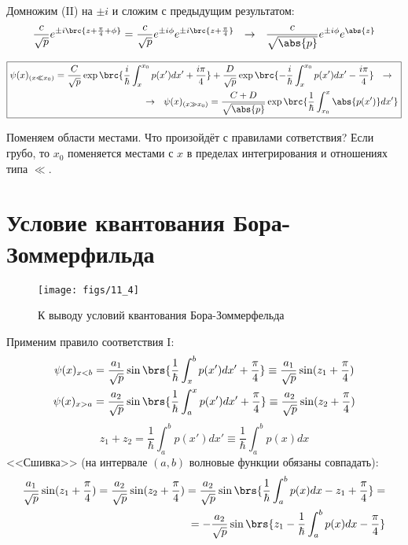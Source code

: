 Домножим (II) на $\pm i$ и сложим с предыдущим результатом:
$$
\frac{c}{\sqrt{p}} e^{\pm i\brc{z+\frac{\pi}{4}+\phi}} = \frac{c}{\sqrt{p}} e^{\pm i \phi} e^{\pm i\brc{z+\frac{\pi}{4}}} ~~\rightarrow~~
\frac{c}{\sqrt{\abs{p}}} e^{\pm i \phi} e^{\abs{z}}
$$

$$
\boxed{
\begin{aligned}
	\psi(x)_{(x \ll x_0)} = \frac{C}{\sqrt{p}} \exp\brc{\frac{i}{\hbar} \int_{x}^{x_0} p(x')dx' + \frac{i\pi}{4}} 
	+ \frac{D}{\sqrt{p}} \exp\brc{-\frac{i}{\hbar} \int_{x}^{x_0} p(x')dx' - \frac{i\pi}{4}} ~~\rightarrow~~ \\
	~~\rightarrow~~ \psi(x)_{(x \gg x_0)} = \frac{C+D}{\sqrt{\abs{p}}} \exp\brc{\frac{1}{\hbar} \int_{x_0}^{x} \abs{p(x')}dx'}
\end{aligned}
}
$$

Поменяем области местами. Что произойдёт с правилами сответствия? Если грубо, то $x_0$ поменяется местами с $x$ в пределах интегрирования и отношениях типа $\ll$.


\section{Условие квантования Бора-Зоммерфильда}

\begin{figure}[h]
\centering
\texttt{[image: figs/11\_4]}
\caption{К выводу условий квантования Бора-Зоммерфельда}
\label{fig:11_4}
\end{figure}

Применим правило соответствия I:
$$
\begin{gathered}
\psi(x)_{x<b} = \frac{a_1}{\sqrt{p}} \sin\brs{\frac{1}{\hbar} \int_{x}^{b} p(x')dx' + \frac{\pi}{4} } \equiv \frac{a_1}{\sqrt{p}} \sin({z_1 + \frac{\pi}{4}}) \\
\psi(x)_{x>a} = \frac{a_2}{\sqrt{p}} \sin\brs{\frac{1}{\hbar} \int_{a}^{x} p(x')dx' + \frac{\pi}{4} } \equiv \frac{a_2}{\sqrt{p}} \sin({z_2 + \frac{\pi}{4}})
\end{gathered}
$$
$$
z_1+z_2 = \frac{1}{\hbar} \int_{a}^{b} p(x')dx' \equiv \frac{1}{\hbar} \int_{a}^{b} p(x)dx
$$
<<Сшивка>> (на интервале $(a, b)$ волновые функции обязаны совпадать):
$$
\begin{aligned}
\frac{a_1}{\sqrt{p}} \sin({z_1+\frac{\pi}{4}}) = \frac{a_2}{\sqrt{p}} \sin({z_2+\frac{\pi}{4}}) = \frac{a_2}{\sqrt{p}} \sin\brs{\frac{1}{\hbar} \int_{a}^{b} p(x)dx - z_1 + \frac{\pi}{4}} = \\
= -\frac{a_2}{\sqrt{p}} \sin\brs{z_1 - \frac{1}{\hbar} \int_{a}^{b} p(x)dx - \frac{\pi}{4} }
\end{aligned}
$$

